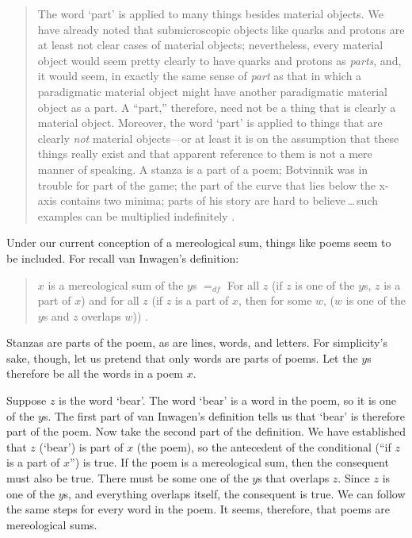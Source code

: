 \documentclass[12pt,twoside]{reedfancy}
\begin{document}
\begin{spacing}{1.25}
\begin{quote}
The word `part' is applied to many things besides material objects.
We have already noted that submicroscopic objects like quarks and
protons are at least not clear cases of material objects;
nevertheless, every material object would seem pretty clearly to have
quarks and protons as \emph{parts}, and, it would seem, in exactly the
same sense of \emph{part} as that in which a paradigmatic material
object might have another paradigmatic material object as a part.  A
``part,'' therefore, need not be a thing that is clearly a material
object.  Moreover, the word `part' is applied to things that are
clearly \emph{not} material objects---or at least it is on the
assumption that these things really exist and that apparent reference
to them is not a mere manner of speaking.  A stanza is a part of a
poem; Botvinnik was in trouble for part of the game; the part of the
curve that lies below the x-axis contains two minima; parts of his
story are hard to believe\,\ldots\,such examples can be multiplied
indefinitely \citeyearpar[18--19]{inwagen1995}.
\end{quote}

Under our current conception of a mereological sum, things like poems
seem to be included.  For recall van Inwagen's definition:

\begin{quote}
$x$ is a mereological sum of the $y$s $=_{df}$ For all $z$ (if $z$ is
  one of the $y$s, $z$ is a part of $x$) and for all $z$ (if $z$ is a
  part of $x$, then for some $w$, ($w$ is one of the $y$s and $z$
  overlaps $w$)) \citeyearpar[618--619]{inwagen2006}.
\end{quote}

Stanzas are parts of the poem, as are lines, words, and letters.  For
simplicity's sake, though, let us pretend that only words are parts of
poems.  Let the $y$s therefore be all the words in a poem $x$.

Suppose $z$ is the word `bear'.  The word `bear' is a word in the
poem, so it is one of the $y$s.  The first part of van Inwagen's
definition tells us that `bear' is therefore part of the poem.  Now
take the second part of the definition.  We have established that $z$
(`bear') is part of $x$ (the poem), so the antecedent of the
conditional (``if $z$ is a part of $x$'') is true.  If the poem is a
mereological sum, then the consequent must also be true.  There must
be some one of the $y$s that overlaps $z$.  Since $z$ is one of the
$y$s, and everything overlaps itself, the consequent is true.  We can
follow the same steps for every word in the poem.  It seems,
therefore, that poems are mereological sums.


\end{spacing}
\end{document}
